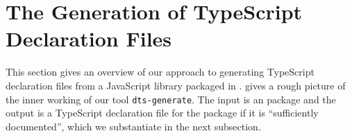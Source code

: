 \documentclass[sigconf]{acmart}
\begin{document}











\section{The Generation of TypeScript Declaration Files}
\label{sec:gener-typescr-decl}
This section gives an overview of our approach to generating
TypeScript declaration files from a JavaScript library packaged in
\NPM.  gives a rough
picture of the inner working of our tool \texttt{dts-generate}. The
input is an \NPM{} package and the output is a TypeScript declaration
file for the package if it is ``sufficiently documented'', which we
substantiate in the next subsection.
\end{document}
